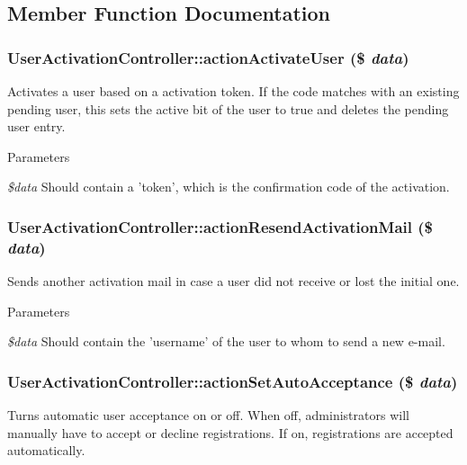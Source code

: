 \subsection{Member Function Documentation}
\hypertarget{classUserActivationController_a7d2da0a8372cbc230a473e49a4bf8ed4}{
\subsubsection[{actionActivateUser}]{\setlength{\rightskip}{0pt plus 5cm}UserActivationController::actionActivateUser (\$ {\em data})}}
\label{classUserActivationController_a7d2da0a8372cbc230a473e49a4bf8ed4}
Activates a user based on a activation token. If the code matches with an existing pending user, this sets the active bit of the user to true and deletes the pending user entry.


\begin{DoxyParams}{Parameters}
\item[{\em \$data}]Should contain a 'token', which is the confirmation code of the activation. \end{DoxyParams}
\hypertarget{classUserActivationController_a7f666fc7c3367c341971926eddf45761}{
\subsubsection[{actionResendActivationMail}]{\setlength{\rightskip}{0pt plus 5cm}UserActivationController::actionResendActivationMail (\$ {\em data})}}
\label{classUserActivationController_a7f666fc7c3367c341971926eddf45761}
Sends another activation mail in case a user did not receive or lost the initial one.


\begin{DoxyParams}{Parameters}
\item[{\em \$data}]Should contain the 'username' of the user to whom to send a new e-\/mail. \end{DoxyParams}
\hypertarget{classUserActivationController_af4bb5616883b5350ba785d697446f92d}{
\subsubsection[{actionSetAutoAcceptance}]{\setlength{\rightskip}{0pt plus 5cm}UserActivationController::actionSetAutoAcceptance (\$ {\em data})}}
\label{classUserActivationController_af4bb5616883b5350ba785d697446f92d}
Turns automatic user acceptance on or off. When off, administrators will manually have to accept or decline registrations. If on, registrations are accepted automatically.

